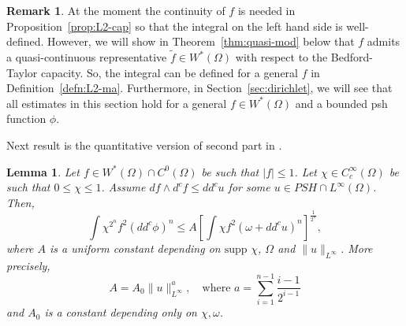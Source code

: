 \documentclass{amsart}
\newcommand{\wt}[1]{\widetilde{#1}}
\newcommand{\om}{\omega}
\newcommand{\Om}{\Omega}
\newcommand{\supp}{\mbox{supp }}
\newtheorem{lem}[thm]{Lemma}
\theoremstyle{definition}
\newtheorem{remark}[thm]{Remark}
\numberwithin{thm}{section}
\numberwithin{equation}{section}
\renewcommand{\[}{\begin{equation}}
\renewcommand{\]}{\end{equation}}
\newcommand{\wed}{\wedge}
\begin{document}
\begin{remark}
At the moment the continuity of $f$ is needed in Proposition~\ref{prop:L2-cap} so that the integral on the left hand side is well-defined. However, we will show in Theorem~\ref{thm:quasi-mod} below that $f$ admits a quasi-continuous representative $\wt f \in W^*(\Om)$ with respect to the Bedford-Taylor capacity. So, the integral can be defined  for a general $f$ in Definition~\ref{defn:L2-ma}. 
Furthermore, in Section~\ref{sec:dirichlet}, we will see that all estimates in this section hold for a general $f\in W^*(\Om)$ and a bounded psh function $\phi$.
\end{remark}


Next result is the quantitative version of second part in \cite[Lemma~2.5]{DMV}.

\begin{lem} \label{lem:wed-prod} Let $f\in W^*(\Om) \cap C^0(\Om)$ be such that $|f| \leq 1$. Let $\chi\in C^\infty_c(\Om)$ be such that  $0\leq \chi \leq 1$. Assume $df \wed d^c f \leq dd^c u$ for some $u \in PSH\cap L^\infty(\Om)$. Then,
$$
	\int \chi^{2^n} f^2 (dd^c\phi)^n \leq  A \left[ \int \chi f^2 (\om + dd^c u)^n \right]^\frac{1}{2^n},
$$
where $A$ is a uniform constant depending on $\supp \chi$, $\Om$ and $\|u\|_{L^\infty}$. More precisely, 
$$ 
	A = A_0 \|u\|_{L^\infty}^{a}, \quad \text{where }  
	a = \sum_{i=1}^{n-1} \frac{i-1}{2^{i-1}}
$$
and $A_0$ is a constant depending only on $\chi, \om$.
\end{lem}
\end{document}
